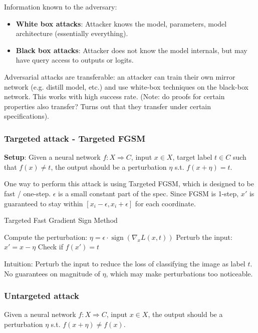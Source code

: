 \documentclass[11pt]{article}
\begin{document}
Information known to the adversary:
\begin{itemize}
	\item \textbf{White box attacks}: Attacker knows the model, parameters, model architecture (essentially everything).
	\item \textbf{Black box attacks}: Attacker does not know the model internals, but may have query access to outputs or logits.  
\end{itemize}
Adversarial attacks are transferable: an attacker can train their own mirror network (e.g. distill model, etc.) and use white-box techniques on the black-box network. This works with high success rate. (Note: do proofs for certain properties also transfer? Turns out that they transfer under certain specifications).

\subsubsection{Targeted attack - Targeted FGSM}
\textbf{Setup}: Given a neural network $f: X \Rightarrow C$, input $x \in X$, target label $t \in C$ such that $f(x) \neq t$, the output should be a perturbation $\eta$ s.t. $f(x + \eta) = t$.

One way to perform this attack is using Targeted FGSM, which is designed to be fast / one-step. $\epsilon$ is a small constant part of the spec. Since FGSM is 1-step, $x'$ is guaranteed to stay within $[x_i - \epsilon, x_i + \epsilon]$ for each coordinate.

\begin{algorithm}
\caption{Targeted Fast Gradient Sign Method}
\begin{algorithmic}[1]
\State Compute the perturbation: $\eta = \epsilon \cdot \operatorname{sign}(\nabla_x L(x, t))$
\State Perturb the input: $x' = x - \eta$
\State Check if $f(x') = t$ 
\end{algorithmic}
\end{algorithm}

\begin{note}
	Intuition: Perturb the input to reduce the loss of classifying the image as label $t$. No guarantees on magnitude of $\eta$, which may make perturbations too noticeable.
\end{note}

\subsubsection{Untargeted attack}
Given a neural network $f: X \Rightarrow C$, input $x \in X$, the output should be a perturbation $\eta$ s.t. $f(x + \eta) \neq f(x)$.
\end{document}

